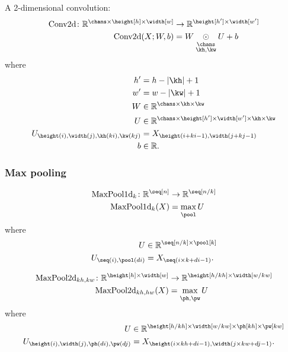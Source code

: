 \documentclass{article}
\newcommand{\reals}{\mathbb{R}}
\begin{document}
A 2-dimensional convolution:
\begin{align*}
  \text{Conv2d} \colon \reals^{\chans \times \height[h] \times \width[w]} %
  &\rightarrow \reals^{\height[h'] \times \width[w']} \\
  \text{Conv2d}(X; W, b) &= W \ndot{\chans \\ \kh, \kw} U + b
\end{align*}  
where
\begin{align*}
h' &= h-|\kh|+1 \\
w' &= w-|\kw|+1 \\
W &\in \reals^{\chans \times \kh \times \kw} \\
U &\in \reals^{\chans \times \height[h'] \times \width[w'] \times \kh \times \kw}  \\
U_{\height(i), \width(j), \kh(ki), \kw(kj)} &= X_{\height(i+ki-1), \width(j+kj-1)} \\
b &\in \reals.
\end{align*}

\subsubsection{Max pooling}

\begin{align*}
\text{MaxPool1d}_{k} \colon \mathbb{R}^{\seq[n]} &\rightarrow \mathbb{R}^{\seq[n/k]} \\
\text{MaxPool1d}_{k}(X) &= \nfun{\pool}{max} U
\end{align*}
where
\begin{align*}
U &\in \reals^{\seq[n / k] \times \pool[k]} \\
U_{\seq(i), \pool(di)} & = X_{\seq(i \times k + di -1)}.
\end{align*}


\begin{align*}
\text{MaxPool2d}_{kh,kw} \colon \mathbb{R}^{\height[h] \times \width[w]} &\rightarrow \mathbb{R}^{\height[h/kh] \times \width[w/kw]} \\
\text{MaxPool2d}_{kh,hw}(X) &= \nfun{\ph, \pw}{max} U
\end{align*}
where
\begin{align*}
U &\in \reals^{\height[h / kh] \times \width[w / kw] \times \ph[kh] \times \pw[kw]} \\
U_{\height(i), \width(j), \ph(di), \pw(dj)} & = X_{\height(i \times kh + di -1), \width(j \times kw + dj -1)}.
\end{align*}
\end{document}
